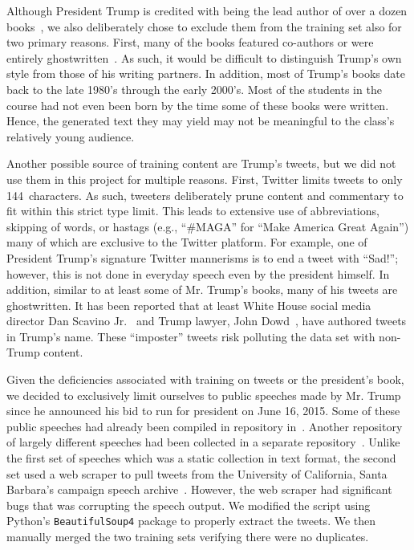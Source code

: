 \documentclass{article}
\begin{document}
Although President Trump is credited with being the lead author of over a dozen books~\cite{trumpArtOfTheDeal,trumpSurvivingAtTheTop,trumpArtOfTheComeback,trumpTheAmericaWeDeserve,trumpHowToGetRich,trumpCrippledAmerica,trumpTimeToGetTough,trumpThinkBig,trump101,trumpNeverGiveUp,trumpWhyWeWantYou,trumpBestGolfAdvice,trumpMidasTouch}, we also deliberately chose to exclude them from the training set also for two primary reasons.  First, many of the books featured co-authors or were entirely ghostwritten~\cite{mayerNewYorkerGhostwriter}.  As such, it would be difficult to distinguish Trump's own style from those of his writing partners.  In addition, most of Trump's books date back to the late 1980's through the early 2000's.  Most of the students in the course had not even been born by the time some of these books were written. Hence, the generated text they may yield may not be meaningful to the class's relatively young audience.

Another possible source of training content are Trump's tweets, but we did not use them in this project for multiple reasons.  First, Twitter limits tweets to only 144~characters. As such, tweeters deliberately prune content and commentary to fit within this strict type limit.  This leads to extensive use of abbreviations, skipping of words, or hastags (e.g., ``\#MAGA'' for ``Make America Great Again'') many of which are exclusive to the Twitter platform. For example, one of President Trump's signature Twitter mannerisms is to end a tweet with ``Sad!''; however, this is not done in everyday speech even by the president himself. In addition, similar to at least some of Mr. Trump's books, many of his tweets are ghostwritten.  It has been reported that at least White House social media director Dan Scavino Jr.~\cite{ohlheiser2017} and Trump lawyer, John Dowd~\cite{phillipsBlake2017}, have authored tweets in Trump's name.  These ``imposter'' tweets risk polluting the data set with non-Trump content.

Given the deficiencies associated with training on tweets or the president's book, we decided to exclusively limit ourselves to public speeches made by Mr. Trump since he announced his bid to run for president on June 16, 2015.  Some of these public speeches had already been compiled in repository in~\cite{ryanMcdermottTrumpSpeeches}.  Another repository of largely different speeches had been collected in a separate repository~\cite{pedramNavidTrumpSpeeches}.  Unlike the first set of speeches which was a static collection in text format, the second set used a web scraper to pull tweets from the University of California, Santa Barbara's campaign speech archive~\cite{americanPresidencyProject}.  However, the web scraper had significant bugs that was corrupting the speech output.  We modified the script using Python's \texttt{BeautifulSoup4} package to properly extract the tweets.  We then manually merged the two training sets verifying there were no duplicates.
\end{document}
